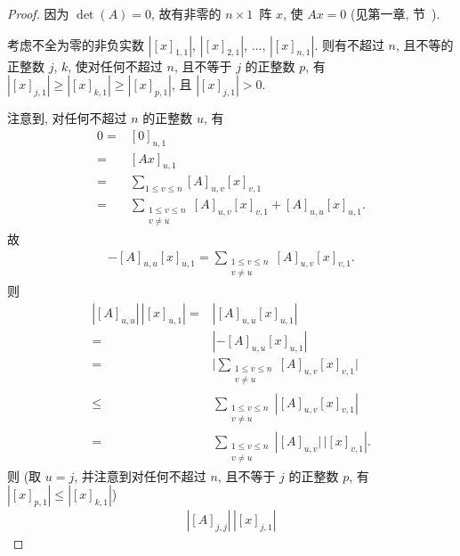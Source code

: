 \begin{proof}
    因为 \(\det {(A)} = 0\),
    故有非零的 \(n \times 1\)~阵 \(x\),
    使 \(Ax = 0\)
    (见第一章, 节~).

    考虑不全为零的非负实数
    \(|[x]_{1,1}|\), \(|[x]_{2,1}|\), \(\dots\), \(|[x]_{n,1}|\).
    则有不超过 \(n\), 且不等的正整数 \(j\), \(k\),
    使对任何不超过 \(n\), 且不等于 \(j\) 的正整数 \(p\),
    有 \(|[x]_{j,1}| \geq |[x]_{k,1}| \geq |[x]_{p,1}|\),
    且 \(|[x]_{j,1}| > 0\).

    注意到, 对任何不超过 \(n\) 的正整数 \(u\), 有
    \begin{align*}
        0
        = {} &
        [0]_{u,1}
        \\
        = {} &
        [A x]_{u,1}
        \\
        = {} &
        \sum_{1 \leq v \leq n}
        {[A]_{u,v} [x]_{v,1}}
        \\
        = {} &
        \sum_{\substack{1 \leq v \leq n \\ v \neq u}}
        {[A]_{u,v} [x]_{v,1}}
        + [A]_{u,u} [x]_{u,1}.
    \end{align*}
    故
    \begin{align*}
        -[A]_{u,u} [x]_{u,1}
        = \sum_{\substack{1 \leq v \leq n \\ v \neq u}}
        {[A]_{u,v} [x]_{v,1}}.
    \end{align*}
    则
    \begin{align*}
        |[A]_{u,u}|\, |[x]_{u,1}|
        = {}    &
        |{[A]_{u,u} [x]_{u,1}}|
        \\
        = {}    &
        |{-[A]_{u,u} [x]_{u,1}}|
        \\
        = {}    &
        \Bigg|
        \sum_{\substack{1 \leq v \leq n \\ v \neq u}}
        {[A]_{u,v} [x]_{v,1}}
        \Bigg|
        \\
        \leq {} &
        \sum_{\substack{1 \leq v \leq n \\ v \neq u}}
        {|{[A]_{u,v} [x]_{v,1}}|}
        \\
        = {}    &
        \sum_{\substack{1 \leq v \leq n \\ v \neq u}}
        {|{[A]_{u,v}|\, |[x]_{v,1}}|}.
    \end{align*}
    则
    (取 \(u = j\),
    并注意到对任何不超过 \(n\), 且不等于 \(j\) 的正整数 \(p\),
    有 \(|[x]_{p,1}| \leq |[x]_{k,1}|\))
    \begin{align*}
        |[A]_{j,j}|\, |[x]_{j,1}|

\end{align*}
\end{proof}
